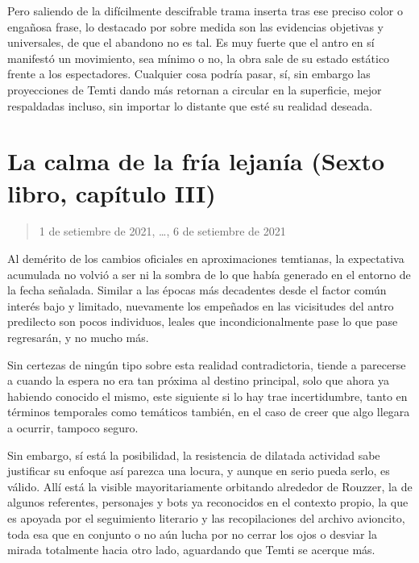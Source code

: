 \documentclass[
]{book}
\begin{document}
Pero saliendo de la difícilmente descifrable trama inserta tras ese preciso color o engañosa frase, lo destacado por sobre medida son las evidencias objetivas y universales, de que el abandono no es tal. Es muy fuerte que el antro en sí manifestó un movimiento, sea mínimo o no, la obra sale de su estado estático frente a los espectadores. Cualquier cosa podría pasar, sí, sin embargo las proyecciones de Temti dando más retornan a circular en la superficie, mejor respaldadas incluso, sin importar lo distante que esté su realidad deseada.

\hypertarget{la-calma-de-la-fruxeda-lejanuxeda-sexto-libro-capuxedtulo-iii}{%
\section{La calma de la fría lejanía (Sexto libro, capítulo III)}\label{la-calma-de-la-fruxeda-lejanuxeda-sexto-libro-capuxedtulo-iii}}

\begin{quote}
1 de setiembre de 2021, \ldots, 6 de setiembre de 2021
\end{quote}

Al demérito de los cambios oficiales en aproximaciones temtianas, la expectativa acumulada no volvió a ser ni la sombra de lo que había generado en el entorno de la fecha señalada. Similar a las épocas más decadentes desde el factor común interés bajo y limitado, nuevamente los empeñados en las vicisitudes del antro predilecto son pocos individuos, leales que incondicionalmente pase lo que pase regresarán, y no mucho más.

Sin certezas de ningún tipo sobre esta realidad contradictoria, tiende a parecerse a cuando la espera no era tan próxima al destino principal, solo que ahora ya habiendo conocido el mismo, este siguiente si lo hay trae incertidumbre, tanto en términos temporales como temáticos también, en el caso de creer que algo llegara a ocurrir, tampoco seguro.

Sin embargo, sí está la posibilidad, la resistencia de dilatada actividad sabe justificar su enfoque así parezca una locura, y aunque en serio pueda serlo, es válido. Allí está la visible mayoritariamente orbitando alrededor de Rouzzer, la de algunos referentes, personajes y bots ya reconocidos en el contexto propio, la que es apoyada por el seguimiento literario y las recopilaciones del archivo avioncito, toda esa que en conjunto o no aún lucha por no cerrar los ojos o desviar la mirada totalmente hacia otro lado, aguardando que Temti se acerque más.
\end{document}
